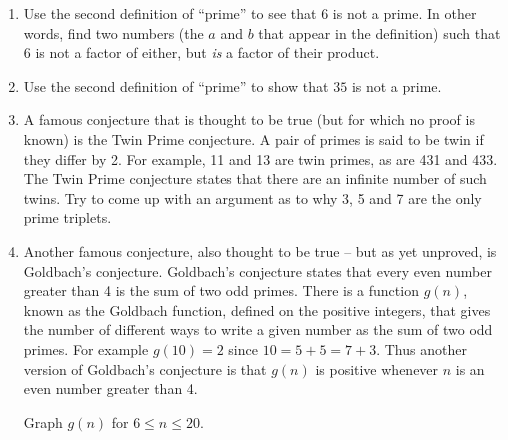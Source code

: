\begin{enumerate}
\wbvfill


\item Use the second definition of ``prime'' to see that $6$ is
not a prime.  In other words, find two numbers (the $a$ and $b$ 
that appear in the definition) such that $6$ is not a factor of
either, but {\em is} a factor of their product.

\wbvfill


\item Use the second definition of ``prime'' to show that $35$ is
not a prime.

\wbvfill


\workbookpagebreak

\item A famous conjecture that is thought to be true (but
for which no proof is known) is the  
Twin Prime conjecture.
A pair of primes is said to be twin if they differ by 2.
For example, 11 and 13 are twin primes, as are 431 and 433.
The Twin Prime conjecture states that there are an infinite
number of such twins.  Try to come up with an argument as
to why 3, 5 and 7 are the only prime triplets.

\wbvfill




\item Another famous conjecture, also thought to be true -- but
as yet unproved, is 
Goldbach's conjecture.  Goldbach's conjecture
states that every even number greater than 4 is the sum of two odd
primes.  There is a function $g(n)$, known as the Goldbach function, defined
on the positive integers, that gives the number of different ways to 
write a given number as the sum of two odd primes.  For example $g(10) = 2$
since $10=5+5=7+3$.  Thus another version of Goldbach's conjecture
is that $g(n)$ is positive whenever $n$ is an even number greater than
4.

Graph $g(n)$ for $6 \leq n \leq 20$.

\wbvfill


\end{enumerate}